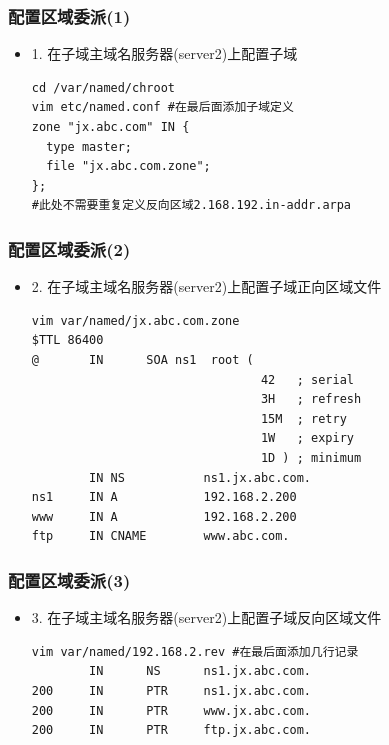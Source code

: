 \documentclass[xcolor=svgnames,presentation]{beamer}
\begin{document}
\begin{frame}[fragile]
\frametitle{配置区域委派(1)}
\label{sec-1-16}
\begin{itemize}

\item 1. 在子域主域名服务器(server2)上配置子域\\
\label{sec-1-16-1}%
\begin{verbatim}
cd /var/named/chroot
vim etc/named.conf #在最后面添加子域定义
zone "jx.abc.com" IN {
  type master;
  file "jx.abc.com.zone";
};
#此处不需要重复定义反向区域2.168.192.in-addr.arpa
\end{verbatim}
\end{itemize} %
\end{frame}
\begin{frame}[fragile]
\frametitle{配置区域委派(2)}
\label{sec-1-17}
\begin{itemize}

\item 2. 在子域主域名服务器(server2)上配置子域正向区域文件\\
\label{sec-1-17-1}%
\begin{verbatim}
vim var/named/jx.abc.com.zone
$TTL 86400
@       IN      SOA ns1  root (
                                42   ; serial
                                3H   ; refresh
                                15M  ; retry
                                1W   ; expiry
                                1D ) ; minimum
        IN NS           ns1.jx.abc.com.
ns1     IN A            192.168.2.200
www     IN A            192.168.2.200
ftp     IN CNAME        www.abc.com.
\end{verbatim}
\end{itemize} %
\end{frame}
\begin{frame}[fragile]
\frametitle{配置区域委派(3)}
\label{sec-1-18}
\begin{itemize}

\item 3. 在子域主域名服务器(server2)上配置子域反向区域文件\\
\label{sec-1-18-1}%
\begin{verbatim}
vim var/named/192.168.2.rev #在最后面添加几行记录
        IN      NS      ns1.jx.abc.com.
200     IN      PTR     ns1.jx.abc.com.
200     IN      PTR     www.jx.abc.com.
200     IN      PTR     ftp.jx.abc.com.
\end{verbatim}
\end{itemize} %
\end{frame}
\end{document}
